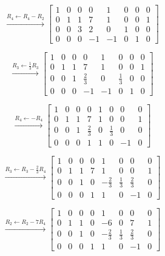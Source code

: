 \begin{answer}
    $$
    \xrightarrow{R_4\leftarrow R_4-R_2}
    \left[
    \begin{array}{cccc|cccc}
        1 & 0 & 0 & 0 & 1 & 0 & 0 & 0\\
        0 & 1 & 1 & 7 & 1 & 0 & 0 & 1\\
        0 & 0 & 3 & 2 & 0 & 1 & 0 & 0\\
        0 & 0 & 0 & -1 & -1 & 0 & 1 & 0
    \end{array}
    \right]
    $$

    $$
    \xrightarrow{R_3\leftarrow\frac13R_3}
    \left[
    \begin{array}{cccc|cccc}
        1 & 0 & 0 & 0 & 1 & 0 & 0 & 0\\
        0 & 1 & 1 & 7 & 1 & 0 & 0 & 1\\
        0 & 0 & 1 & \frac23 & 0 & \frac13 & 0 & 0\\
        0 & 0 & 0 & -1 & -1 & 0 & 1 & 0
    \end{array}
    \right]
    $$

    $$
    \xrightarrow{R_4\leftarrow-R_4}
    \left[
    \begin{array}{cccc|cccc}
        1 & 0 & 0 & 0 & 1 & 0 & 0 & 0\\
        0 & 1 & 1 & 7 & 1 & 0 & 0 & 1\\
        0 & 0 & 1 & \frac23 & 0 & \frac13 & 0 & 0\\
        0 & 0 & 0 & 1 & 1 & 0 & -1 & 0
    \end{array}
    \right]
    $$

    $$
    \xrightarrow{R_3\leftarrow R_3-\frac23R_4}
    \left[
    \begin{array}{cccc|cccc}
        1 & 0 & 0 & 0 & 1 & 0 & 0 & 0\\
        0 & 1 & 1 & 7 & 1 & 0 & 0 & 1\\
        0 & 0 & 1 & 0 & -\frac23 & \frac13 & \frac23 & 0\\
        0 & 0 & 0 & 1 & 1 & 0 & -1 & 0
    \end{array}
    \right]
    $$

    $$
    \xrightarrow{R_2\leftarrow R_2-7R_4}
    \left[
    \begin{array}{cccc|cccc}
        1 & 0 & 0 & 0 & 1 & 0 & 0 & 0\\
        0 & 1 & 1 & 0 & -6 & 0 & 7 & 1\\
        0 & 0 & 1 & 0 & -\frac23 & \frac13 & \frac23 & 0\\
        0 & 0 & 0 & 1 & 1 & 0 & -1 & 0
    \end{array}
    \right]
    $$


\end{answer}
